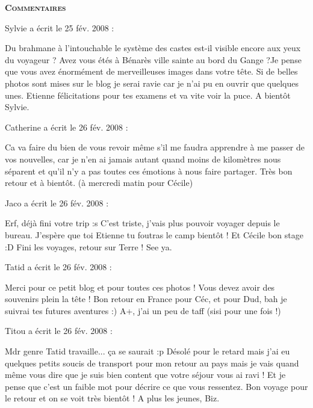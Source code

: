 \bigskip
\textbf{\textsc{Commentaires}}

\medskip
Sylvie a écrit le 25 fév. 2008 :
\begin{displayquote}
Du brahmane à l'intouchable le système des castes est-il visible encore aux yeux du voyageur ?
Avez vous étés à Bénarès ville sainte au bord du Gange ?Je pense que vous avez énormément de merveilleuses images dans votre tête. Si de belles photos sont mises sur le blog je serai ravie car je n'ai pu en ouvrir que quelques unes. Etienne félicitations pour tes examens et va vite voir la puce. A bientôt Sylvie.
\end{displayquote}

\medskip
Catherine a écrit le 26 fév. 2008 :
\begin{displayquote}
Ca va faire du bien de vous revoir même s'il me faudra apprendre à me passer de vos nouvelles, car je n'en ai jamais autant quand moins de kilomètres nous séparent et qu'il n'y a pas toutes ces émotions à nous faire partager.
Très bon retour et à bientôt. (à mercredi matin pour Cécile)
\end{displayquote}

\medskip
Jaco a écrit le 26 fév. 2008 :
\begin{displayquote}
Erf, déjà fini votre trip :s C'est triste, j'vais plus pouvoir voyager depuis le bureau.
J'espère que toi Etienne tu foutras le camp bientôt !
Et Cécile bon stage :D Fini les voyages, retour sur Terre !
See ya.
\end{displayquote}

\medskip
Tatid a écrit le 26 fév. 2008 :
\begin{displayquote}
Merci pour ce petit blog et pour toutes ces photos ! Vous devez avoir des souvenirs plein la tête !
Bon retour en France pour Céc, et pour Dud, bah je suivrai tes futures aventures :)
A+, j'ai un peu de taff (sisi pour une fois !)
\end{displayquote}

\medskip
Titou a écrit le 26 fév. 2008 :
\begin{displayquote}
Mdr genre Tatid travaille... ça se saurait :p
Désolé pour le retard mais j'ai eu quelques petits soucis de transport pour mon retour au pays mais je vais quand même vous dire que je suis bien content que votre séjour vous ai ravi ! Et je pense que c'est un faible mot pour décrire ce que vous ressentez. Bon voyage pour le retour et on se voit très bientôt !
A plus les jeunes, Biz.
\end{displayquote}

